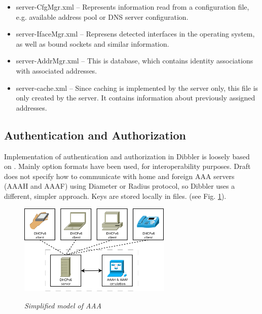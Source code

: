 \begin{itemize}
\item server-CfgMgr.xml -- Represents information read from a
  configuration file, e.g. available address pool or DNS server
      configuration.
\item server-IfaceMgr.xml -- Represens detected interfaces in the
  operating system, as well as bound sockets and similar information.
\item server-AddrMgr.xml -- This is database, which contains identity
  associations with associated addresses.
 \item server-cache.xml -- Since caching is implemented by the server
      only, this file is only created by the server. It contains
      information about previously assigned addresses. 
\end{itemize}


\subsection{Authentication and Authorization}
\label{features-auth}

Implementation of authentication and authorization in Dibbler is
loosely based on \cite{draft-aaa}. Mainly option formats have been
used, for interoperability purposes. Draft does not specify how to
communicate with home and foreign AAA servers (AAAH and AAAF) using
Diameter or Radius protocol, so Dibbler uses a different, simpler
approach. Keys are stored locally in files. (see Fig. \ref{fig-aaa}).

\begin{figure}[ht]
\begin{center}
\label{fig-aaa}
\includegraphics[width=0.65\textwidth]{dibbler-aaa}
\caption{\emph{Simplified model of AAA}}
\end{center}
\end{figure}

